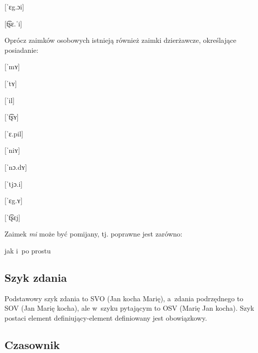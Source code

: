 \begin{spacing}{1.1}
\begin{multicols}{2}
[ˈɛg.ɔi]

[t͡ʂɛ.ˈi]

\end{multicols}

Oprócz zaimków osobowych istnieją również zaimki dzierżawcze, określające 
posiadanie:

\begin{multicols}{2}

[ˈmʏ]

[ˈtʏ]


[ˈil]

[ˈt͡ʂʏ]

[ˈɛ.pil]

[ˈniʏ]

[ˈnɔ.dʏ]

[ˈtjɔ.i]

[ˈɛg.ʏ]

[ˈt͡ʂɛj]

\end{multicols}

\noindent
Zaimek \emph{mi} może być pomijany, tj. poprawne jest zarówno: 


\noindent
jak i~po prostu


\subsection{Szyk zdania}

Podstawowy szyk zdania to SVO (Jan kocha Marię), a~zdania podrzędnego to SOV 
(Jan Marię kocha), ale w~szyku pytającym to OSV (Marię Jan kocha). Szyk postaci 
element definiujący-element definiowany jest obowiązkowy.

\subsection{Czasownik}


\end{spacing}
